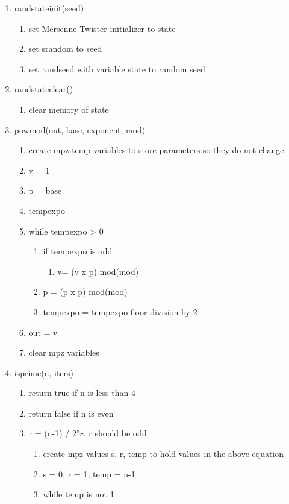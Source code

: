 \documentclass[11pt]{article}
\begin{document}
\begin{enumerate}
\item randstateinit(seed)
	\begin{enumerate}
	\item set Mersenne Twister initializer to state
	\item set srandom to seed
	\item set randseed with variable state to random seed
	\end{enumerate}
\item randstateclear()
	\begin{enumerate}
	\item clear memory of state
	\end{enumerate}
\item powmod(out, base, exponent, mod)
	\begin{enumerate}
	\item create mpz temp variables to store parameters so they do not change
	\item v = 1
	\item p = base
	\item tempexpo
	\item while tempexpo > 0
		\begin{enumerate}
		\item if tempexpo is odd
			\begin{enumerate}
			\item v= (v x p) mod(mod)
			\end{enumerate}
		\item p = (p x p) mod(mod)
		\item tempexpo = tempexpo floor division by 2
		\end{enumerate}
	\item out = v
	\item clear mpz variables
	\end{enumerate}
\item isprime(n, iters)
	\begin{enumerate}
	\item return true if n is less than 4
	\item return false if n is even
	\item r = (n-1) / \(2^s r\). r should be odd
		\begin{enumerate}
		\item create mpz values s, r, temp to hold values in the above equation
		\item s = 0, r = 1, temp = n-1
		\item while temp is not 1

\end{enumerate}
\end{enumerate}
\end{enumerate}
\end{document}

